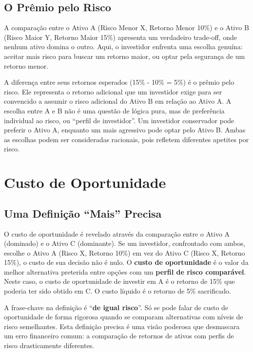 \documentclass[
  a4paper,
]{book}
\begin{document}
\subsection{O Prêmio pelo Risco}\label{o-pruxeamio-pelo-risco}

A comparação entre o Ativo A (Risco Menor X, Retorno Menor 10\%) e o
Ativo B (Risco Maior Y, Retorno Maior 15\%) apresenta um verdadeiro
trade-off, onde nenhum ativo domina o outro. Aqui, o investidor enfrenta
uma escolha genuína: aceitar mais risco para buscar um retorno maior, ou
optar pela segurança de um retorno menor.

A diferença entre seus retornos esperados (15\% - 10\% = 5\%) é o prêmio
pelo risco. Ele representa o retorno adicional que um investidor exige
para ser convencido a assumir o risco adicional do Ativo B em relação ao
Ativo A. A escolha entre A e B não é uma questão de lógica pura, mas de
preferência individual ao risco, ou ``perfil de investidor''. Um
investidor conservador pode preferir o Ativo A, enquanto um mais
agressivo pode optar pelo Ativo B. Ambas as escolhas podem ser
consideradas racionais, pois refletem diferentes apetites por risco.

\section{Custo de Oportunidade}\label{custo-de-oportunidade}

\subsection{Uma Definição ``Mais''
Precisa}\label{uma-definiuxe7uxe3o-mais-precisa}

O custo de oportunidade é revelado através da comparação entre o Ativo A
(dominado) e o Ativo C (dominante). Se um investidor, confrontado com
ambos, escolhe o Ativo A (Risco X, Retorno 10\%) em vez do Ativo C
(Risco X, Retorno 15\%), o custo de sua decisão não é nulo. O
\textbf{custo de oportunidade} é o valor da melhor alternativa preterida
entre opções com um \textbf{perfil de risco comparável}. Neste caso, o
custo de oportunidade de investir em A é o retorno de 15\% que poderia
ter sido obtido em C. O custo líquido é o retorno de 5\% sacrificado.

A frase-chave na definição é ``\textbf{de igual risco}''. Só se pode
falar de custo de oportunidade de forma rigorosa quando se comparam
alternativas com níveis de risco semelhantes. Esta definição precisa é
uma visão poderosa que desmascara um erro financeiro comum: a comparação
de retornos de ativos com perfis de risco drasticamente diferentes.
\end{document}

